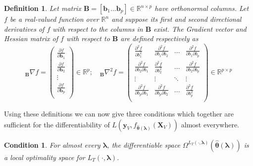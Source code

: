 \documentclass{statsoc}
\newtheorem{definition}{Definition}
\newtheorem{condition}{Condition}
\begin{document}
\begin{definition}
Let matrix $\boldsymbol B = [ \boldsymbol b_1 \hdots \boldsymbol b_p ] \in \mathbb{R}^{n \times p}$ have orthonormal columns. Let $f$ be a real-valued function over $\mathbb{R}^n$ and suppose its first and second directional derivatives of $f$ with respect to the columns in $\boldsymbol B$ exist. The Gradient vector and Hessian matrix of $f$ with respect to $\boldsymbol B$ are defined respectively as
\begin{equation}\label{eq:hess}
_{\boldsymbol B} \nabla f  =
\left (
\begin{array}{c}
\frac{\partial f}{\partial \boldsymbol b_1} \\
\frac{\partial f}{\partial \boldsymbol b_2} \\
\vdots\\
\frac{\partial f}{\partial \boldsymbol b_p}\\
\end{array}
\right ) \in \mathbb{R}^p;
\quad
_{\boldsymbol B}\nabla^2 f =
\left (
\begin{array}{cccc}
\frac{\partial^2 f}{\partial b_1^2} & \frac{\partial^2 f}{\partial b_1 \partial b_2} & ...  & \frac{\partial^2 f}{\partial b_1 \partial b_p} \\
\frac{\partial^2 f}{\partial b_2 \partial b_1} & \frac{\partial^2 f}{\partial b_2^2} & ...  & \frac{\partial^2 f}{\partial b_2 \partial b_p} \\
\vdots & \vdots &  \ddots & \vdots \\
\frac{\partial^2 f}{\partial b_p \partial b_1} & \frac{\partial^2 f}{\partial b_p \partial b_2} & ...  & \frac{\partial^2 f}{\partial b_p^2} \\
\end{array}
\right ) \in \mathbb{R}^{p \times p}
\end{equation}
\end{definition}

Using these definitions we can now give three conditions which together are sufficient for the differentiability of $L \left( \boldsymbol{y}_V, f_{\hat{\boldsymbol \theta}(\boldsymbol{\lambda})}(\boldsymbol{X}_V) \right )$ almost everywhere.

\begin{condition}
For almost every $\boldsymbol{\lambda}$, the differentiable space $\Omega^{L_T(\cdot, \boldsymbol{\lambda})}(\hat{\boldsymbol \theta}\left(\boldsymbol{\lambda}\right))$ is a local optimality space for $L_T\left(\cdot,\boldsymbol{\lambda}\right)$.
\end{condition}
\end{document}

